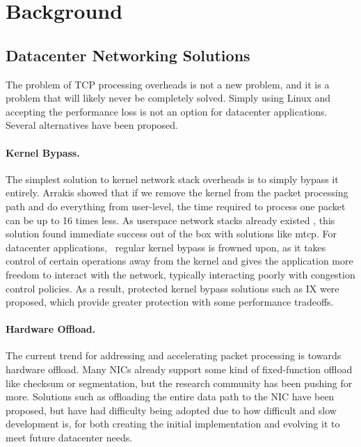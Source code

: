 \section{Background}\label{Background}

\subsection{Datacenter Networking Solutions}

The problem of TCP processing overheads is not a new problem, and it is a 
problem that will likely never be completely solved. Simply using Linux and
accepting the performance loss is not an option for datacenter 
applications. Several alternatives have been proposed.

\paragraph{Kernel Bypass.} 

The simplest solution to kernel network stack overheads is to simply bypass
it entirely. Arrakis \cite{peter:arrakis} showed that if we remove the kernel
from the packet processing path and do everything from user-level, the time 
required to process one packet can be up to 16 times less. As userspace network
stacks already existed \cite{lwip}, this solution found immediate success out of
the box with solutions like mtcp\cite{mtcp}. For datacenter applications, \
regular kernel bypass is frowned upon, as it takes control of certain operations
away from the kernel and gives the application more freedom to interact with the
network, typically interacting poorly with congestion control policies. As a 
result, protected kernel bypass solutions such as IX \cite{belay:ix} were 
proposed, which provide greater protection with some performance tradeoffs. 

\paragraph{Hardware Offload.}

The current trend for addressing and accelerating packet processing is towards
hardware offload\cite{chelsio_toe}. Many NICs already support some kind of 
fixed-function offload like checksum or segmentation, but the research community
has been pushing for more. Solutions such as offloading the entire data path to 
the NIC have been proposed, but have had difficulty being adopted due to how 
difficult and slow development is, for both creating the initial implementation 
and evolving it to meet future datacenter needs. 

